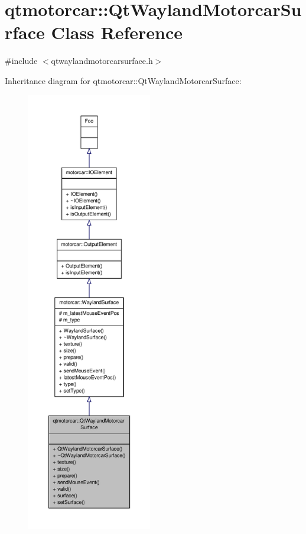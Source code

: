 \hypertarget{classqtmotorcar_1_1QtWaylandMotorcarSurface}{\section{qtmotorcar\-:\-:Qt\-Wayland\-Motorcar\-Surface Class Reference}
\label{classqtmotorcar_1_1QtWaylandMotorcarSurface}
}


{\ttfamily \#include $<$qtwaylandmotorcarsurface.\-h$>$}



Inheritance diagram for qtmotorcar\-:\-:Qt\-Wayland\-Motorcar\-Surface\-:
\nopagebreak
\begin{figure}[H]
\begin{center}
\leavevmode
\includegraphics[height=550pt]{classqtmotorcar_1_1QtWaylandMotorcarSurface__inherit__graph}
\end{center}
\end{figure}



